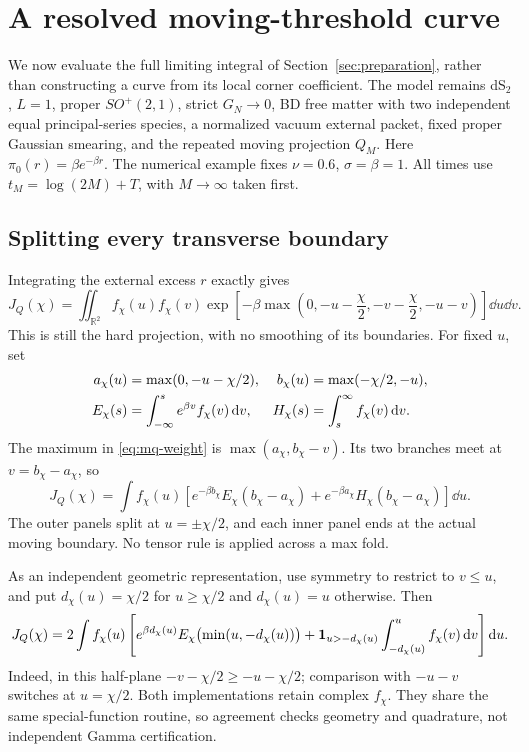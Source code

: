 \section{A resolved moving-threshold curve}
\label{sec:movingcurve}
We now evaluate the full limiting integral of
Section~\ref{sec:preparation}, rather than constructing a curve from its
local corner coefficient. The model remains dS$_2$, $L=1$, proper
$SO^+(2,1)$, strict $G_N\to0$, BD free matter with two independent equal
principal-series species, a normalized vacuum external packet, fixed
proper Gaussian smearing, and the repeated moving projection $Q_M$.
Here $\pi_0(r)=\beta e^{-\beta r}$. The numerical example fixes
$\nu=0.6$, $\sigma=\beta=1$. All times use
$t_M=\log(2M)+T$, with $M\to\infty$ taken first.

\subsection{Splitting every transverse boundary}
Integrating the external excess $r$ exactly gives
\begin{equation}
 J_Q(\chi)=\iint_{\mathbb R^2} f_\chi(u)f_\chi(v)
 \exp\!\left[-\beta\max\left(0,-u-\frac\chi2,
                  -v-\frac\chi2,-u-v\right)\right]\dd u\dd v.
 \label{eq:mq-weight}
\end{equation}
This is still the hard projection, with no smoothing of its boundaries.
For fixed $u$, set
\begin{align}
 a_\chi(u)&=\max(0,-u-\chi/2),&
 b_\chi(u)&=\max(-\chi/2,-u),\notag\\
 E_\chi(s)&=\int_{-\infty}^s e^{\beta v}f_\chi(v)\mathop{}\!\mathrm d v,&
 H_\chi(s)&=\int_s^\infty f_\chi(v)\mathop{}\!\mathrm d v.
\end{align}
The maximum in \eqref{eq:mq-weight} is
$\max(a_\chi,b_\chi-v)$. Its two branches meet at $v=b_\chi-a_\chi$, so
\begin{equation}
 J_Q(\chi)=\int f_\chi(u)
 \left[e^{-\beta b_\chi}E_\chi(b_\chi-a_\chi)
       +e^{-\beta a_\chi}H_\chi(b_\chi-a_\chi)\right]\dd u.
 \label{eq:mq-slice}
\end{equation}
The outer panels split at $u=\pm\chi/2$, and each inner panel ends at
the actual moving boundary. No tensor rule is applied across a max fold.

As an independent geometric representation, use symmetry to restrict to
$v\le u$, and put $d_\chi(u)=\chi/2$ for $u\ge\chi/2$ and
$d_\chi(u)=u$ otherwise. Then
\begin{equation}
 J_Q(\chi)=2\int f_\chi(u)\left[
 e^{\beta d_\chi(u)}E_\chi\bigl(\min(u,-d_\chi(u))\bigr)
 +\mathbf 1_{u>-d_\chi(u)}\int_{-d_\chi(u)}^u f_\chi(v)\mathop{}\!\mathrm d v
 \right]\mathop{}\!\mathrm d u.
 \label{eq:mq-ordered}
\end{equation}
Indeed, in this half-plane $-v-\chi/2\ge-u-\chi/2$; comparison with
$-u-v$ switches at $u=\chi/2$. Both implementations retain complex
$f_\chi$. They share the same special-function routine, so agreement
checks geometry and quadrature, not independent Gamma certification.

